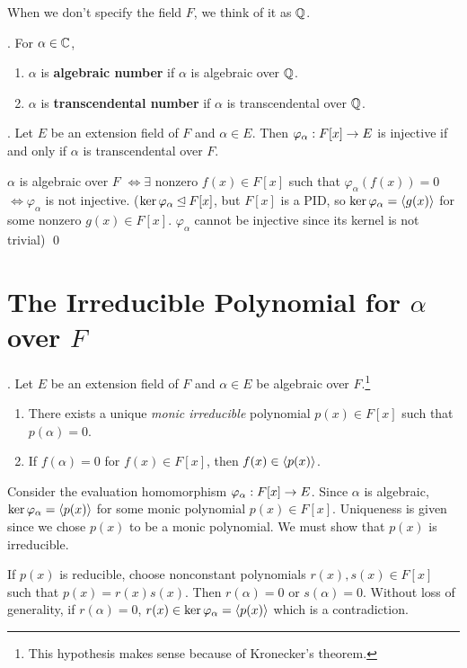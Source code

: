 When we don't specify the field \(F\), we think of it as \(\mathbb{Q}\).

. For \(\alpha \in \mathbb{C}\),
\begin{enumerate}
    \item \(\alpha\) is \textbf{algebraic number} if \(\alpha\) is algebraic over \(\mathbb{Q}\).
    \item \(\alpha\) is \textbf{transcendental number} if \(\alpha\) is transcendental over \(\mathbb{Q}\).
\end{enumerate}

\pagebreak

\thm. Let \(E\) be an extension field of \(F\) and \(\alpha \in E\). Then \(\varphi_\alpha : F[x] \rightarrow E\) is injective if and only if \(\alpha\) is transcendental over \(F\).

\pf \(\alpha\) is algebraic over \(F\) \(\iff \exists\) nonzero \(f(x) \in F[x]\) such that \(\varphi_\alpha(f(x)) = 0\) \(\iff \varphi_\alpha\) is not injective. (\(\ker \varphi_\alpha \unlhd F[x]\), but \(F[x]\) is a PID, so \(\ker \varphi_\alpha = \left\langle g(x) \right\rangle\) for some nonzero \(g(x) \in F[x]\). \(\varphi_\alpha\) cannot be injective since its kernel is not trivial) \qed

\section*{The Irreducible Polynomial for \(\alpha\) over \(F\)}

\thm. Let \(E\) be an extension field of \(F\) and \(\alpha \in E\) be algebraic over \(F\).\footnote{This hypothesis makes sense because of Kronecker's theorem.}
\begin{enumerate}
    \item There exists a unique \textit{monic irreducible} polynomial \(p(x) \in F[x]\) such that \(p(\alpha) = 0\).
    \item If \(f(\alpha) = 0\) for \(f(x) \in F[x]\), then \(f(x) \in \left\langle p(x) \right\rangle\).
\end{enumerate}

\pf Consider the evaluation homomorphism \(\varphi_\alpha : F[x] \rightarrow E\). Since \(\alpha\) is algebraic, \(\ker \varphi_\alpha = \left\langle p(x) \right\rangle\) for some monic polynomial \(p(x) \in F[x]\). Uniqueness is given since we chose \(p(x)\) to be a monic polynomial. We must show that \(p(x)\) is irreducible.

 If \(p(x)\) is reducible, choose nonconstant polynomials \(r(x), s(x) \in F[x]\) such that \(p(x) = r(x)s(x)\). Then \(r(\alpha) = 0\) or \(s(\alpha) = 0\). Without loss of generality, if \(r(\alpha) = 0\), \(r(x) \in \ker \varphi_\alpha = \left\langle p(x) \right\rangle\) which is a contradiction.

